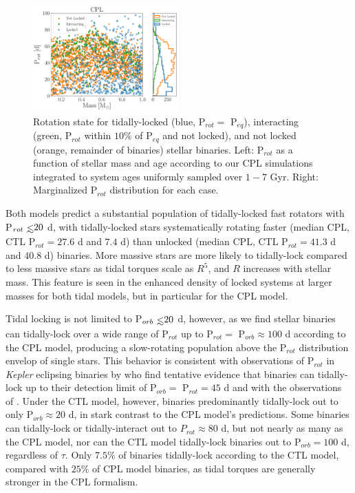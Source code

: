\documentclass[twocolumn]{aastex61}
\def\lsim{~\rlap{$<$}{\lower 1.0ex\hbox{$\sim$}}}
\newcommand{\kepler}[0]{\textit{Kepler}\xspace}
\begin{document}
\begin{figure}
	\includegraphics[width=0.5\textwidth]{../Plots/lockedCPL.pdf}
   \caption{Rotation state for tidally-locked (blue, P$_{rot} = $ P$_{eq}$), interacting (green, P$_{rot}$ within $10\%$ of P$_{eq}$ and not locked), and not locked (orange, remainder of binaries) stellar binaries. Left: P$_{rot}$ as a function of stellar mass and age according to our CPL simulations integrated to system ages uniformly sampled over $1-7$ Gyr. Right: Marginalized P$_{rot}$ distribution for each case.}%
    \label{fig:lockedCPL}%
\end{figure}

Both models predict a substantial population of tidally-locked fast rotators with P$_{rot} \lsim 20$ d, with tidally-locked stars systematically rotating faster (median CPL, CTL P$_{rot} = 27.6$ d and $7.4$ d) than unlocked (median CPL, CTL P$_{rot} = 41.3$ d and $40.8$ d) binaries. More massive stars are more likely to tidally-lock compared to less massive stars as tidal torques scale as $R^5$, and $R$ increases with stellar mass.  This feature is seen in the enhanced density of locked systems at larger masses for both tidal models, but in particular for the CPL model.

Tidal locking is not limited to P$_{orb} \lsim 20$ d, however, as we find stellar binaries can tidally-lock over a wide range of P$_{rot}$ up to P$_{rot} =$ P$_{orb} \approx 100$ d according to the CPL model, producing a slow-rotating population above the P$_{rot}$ distribution envelop of single stars. This behavior is consistent with observations of P$_{rot}$ in \kepler eclipsing binaries by \citet{Lurie2017} who find tentative evidence that binaries can tidally-lock up to their detection limit of P$_{orb} = $ P$_{rot} = 45$ d and with the observations of \citet{Abt2004}.  Under the CTL model, however, binaries predominantly tidally-lock out to only P$_{orb} \approx 20$ d, in stark contrast to the CPL model's predictions. Some binaries can tidally-lock or tidally-interact out to $P_{rot} \approx 80$ d, but not nearly as many as the CPL model, nor can the CTL model tidally-lock binaries out to P$_{orb} = 100$ d, regardless of $\tau$. Only $7.5\%$ of binaries tidally-lock according to the CTL model, compared with $25\%$ of CPL model binaries, as tidal torques are generally stronger in the CPL formalism.   
\end{document}
